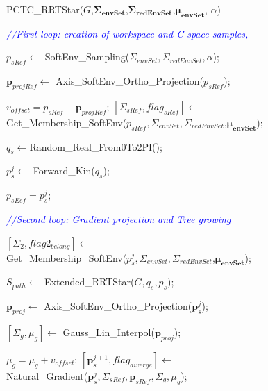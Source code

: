 \documentclass[letterpaper, 10 pt, conference]{ieeeconf}  %
\newcommand{\mb}[1]{{\boldsymbol{#1}}}
\begin{document}
\begin{algorithm}[H]
 \caption{PCTC\_RRTStar($G$,$\mb{\Sigma_{envSet}}$,$\mb{\Sigma_{redEnvSet}}$,$\mb{\mu_{envSet}}$, $\alpha$)}\label{PCTCRRT}


\setcounter{AlgoLine}{0}
\BlankLine
\textcolor{blue}{\emph{//First loop: creation of workspace and C-space samples,}\;}

	{
	\BlankLine
		$p_{sRef} \leftarrow $ SoftEnv\_Sampling($\Sigma_{envSet}, \Sigma_{redEnvSet},\alpha$);
		
		$\mb{p}_{projRef} \leftarrow$	Axis\_SoftEnv\_Ortho\_Projection($p_{sRef}$);
		
		$v_{offset} = p_{sRef}-\mb{p}_{projRef} $;
		\BlankLine
		$[\Sigma_{sRef},flag_{sRef}]\leftarrow$\\ Get\_Membership\_SoftEnv($p_{sRef},\Sigma_{envSet}, \Sigma_{redEnvSet}$,$\mb{\mu_{envSet}}$);
		\BlankLine
		
		$q_s\leftarrow $Random\_Real\_From0To2PI();
		
		$p_s^j\leftarrow $ Forward\_Kin($q_s$);
		
		$p_{sEef}=p_s^j$;
		\BlankLine
			
	\textcolor{blue}{\emph{//Second loop: Gradient projection and Tree growing}}
		{
			\BlankLine

			$[\Sigma_2,flag2_{belong}]\leftarrow$\\ 
			Get\_Membership\_SoftEnv($p_s^j,\Sigma_{envSet}, \Sigma_{redEnvSet}$,$\mb{\mu_{envSet}}$);
			\BlankLine
			
			{
				
				$S_{path}\leftarrow $ Extended\_RRTStar($G,q_s,p_s$);
			}
			\BlankLine
				
			$\mb{p}_{proj} \leftarrow$	Axis\_SoftEnv\_Ortho\_Projection($\mb{p}_s^j$);
			
			$[\Sigma_{g},\mu_{g}] \leftarrow$ Gauss\_Lin\_Interpol($\mb{p}_{proj}$);
			
			$\mu_{g} = \mu_{g} + v_{offset}$;
			\BlankLine
			\BlankLine
			$[\mb{p}_s^{j+1},flag_{diverge}] \leftarrow$\\
			 Natural\_Gradient($\mb{p}_s^{j},\Sigma_{sRef},\mb{p}_{sRef},\Sigma_{g},\mu_{g}$);
			\BlankLine
			{
			
}}}
\end{algorithm}
\end{document}

